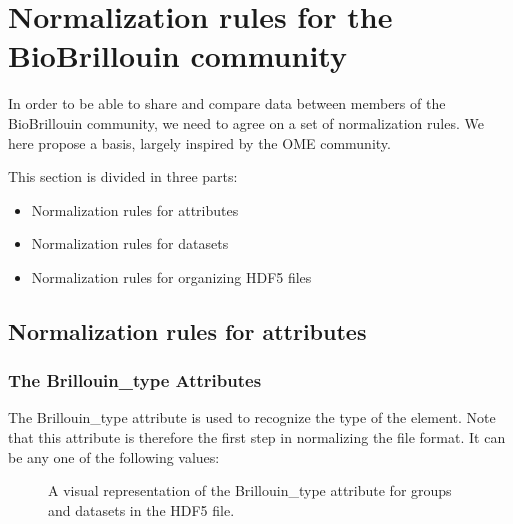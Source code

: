 \documentclass[letterpaper,10pt,english]{sphinxmanual}
\begin{document}
\sphinxstepscope


\chapter{Normalization rules for the BioBrillouin community}
\label{\detokenize{source/normalization:normalization-rules-for-the-biobrillouin-community}}\label{\detokenize{source/normalization:normalization}}\label{\detokenize{source/normalization::doc}}
\sphinxAtStartPar
In order to be able to share and compare data between members of the BioBrillouin community, we need to agree on a set of normalization rules. We here propose a basis, largely inspired by the OME community.

\sphinxAtStartPar
This section is divided in three parts:
\begin{itemize}
\item {} 
\sphinxAtStartPar
Normalization rules for attributes

\item {} 
\sphinxAtStartPar
Normalization rules for datasets

\item {} 
\sphinxAtStartPar
Normalization rules for organizing HDF5 files

\end{itemize}


\section{Normalization rules for attributes}
\label{\detokenize{source/normalization:normalization-rules-for-attributes}}

\subsection{The Brillouin\_type Attributes}
\label{\detokenize{source/normalization:the-brillouin-type-attributes}}
\sphinxAtStartPar
The Brillouin\_type attribute is used to recognize the type of the element. Note that this attribute is therefore the first step in normalizing the file format. It can be any one of the following values:

\begin{figure}[htbp]
\centering
\capstart

\noindent{}
\caption{A visual representation of the Brillouin\_type attribute for groups and datasets in the HDF5 file.}\label{\detokenize{source/normalization:id1}}\end{figure}
\end{document}
